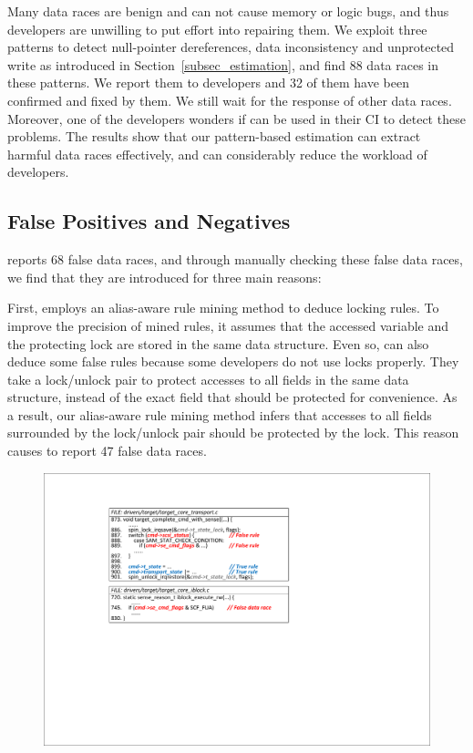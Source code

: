 Many data races are benign and can not cause memory 
or logic bugs, and thus developers are unwilling to put effort into repairing 
them. We exploit three patterns to detect null-pointer dereferences, data 
inconsistency and unprotected write as introduced in 
Section~\ref{subsec_estimation}, and find 88 data races in these patterns. We 
report them to developers and 32 of them have been confirmed and fixed by them. 
We still wait for the response of other data races. Moreover, one of the 
developers wonders if \sys can be used in their CI to detect these problems. 
The results show that our pattern-based estimation can extract harmful data 
races effectively, and can considerably reduce the workload of developers.

\subsection{False Positives and Negatives}
\label{subsec_false_pos_neg}
 \sys reports 68 false data races, and through manually 
checking these false data races, we find that they are introduced for three 
main reasons:

First, \sys employs an alias-aware rule mining method to deduce locking rules. 
To improve the precision of mined rules, it assumes that the accessed variable 
and the protecting lock are stored in the same data structure. Even so, \sys 
can also deduce some false rules because some developers do not use locks 
properly. They take a lock/unlock pair to protect accesses to all fields in the 
same data structure, instead of the exact field that should be protected for 
convenience. As a result, our alias-aware rule mining method infers that 
accesses to all fields surrounded by the lock/unlock pair should be protected 
by the lock. This reason causes \sys to report 47 false data races.

\begin{figure}[htbp]
	\centering
	\includegraphics[width=1\linewidth]{figures/fig_demo_false_rule.pdf}
	\label{fig_demo_false_rule}
\end{figure}

